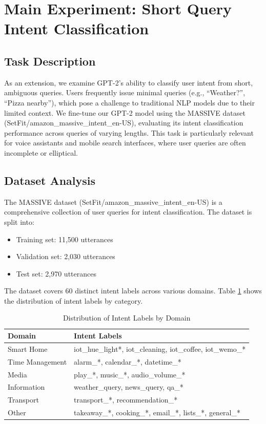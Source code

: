 \documentclass{article}
\begin{document}
\section{Main Experiment: Short Query Intent Classification}
\subsection{Task Description}
As an extension, we examine GPT-2's ability to classify user intent from short, ambiguous queries. Users frequently issue minimal queries (e.g., ``Weather?'', ``Pizza nearby''), which pose a challenge to traditional NLP models due to their limited context. We fine-tune our GPT-2 model using the MASSIVE dataset (SetFit/amazon\_massive\_intent\_en-US), evaluating its intent classification performance across queries of varying lengths. This task is particularly relevant for voice assistants and mobile search interfaces, where user queries are often incomplete or elliptical.

\subsection{Dataset Analysis}
The MASSIVE dataset (SetFit/amazon\_massive\_intent\_en-US) is a comprehensive collection of user queries for intent classification. The dataset is split into:
\begin{itemize}
    \item Training set: 11,500 utterances
    \item Validation set: 2,030 utterances
    \item Test set: 2,970 utterances
\end{itemize}

The dataset covers 60 distinct intent labels across various domains. Table \ref{tab:intent_labels} shows the distribution of intent labels by category.

\begin{table}[h]
\centering
\begin{tabular}{ll}
\toprule
\textbf{Domain} & \textbf{Intent Labels} \\
\midrule
Smart Home & iot\_hue\_light*, iot\_cleaning, iot\_coffee, iot\_wemo\_* \\
\midrule
Time Management & alarm\_*, calendar\_*, datetime\_* \\
\midrule
Media & play\_*, music\_*, audio\_volume\_* \\
\midrule
Information & weather\_query, news\_query, qa\_* \\
\midrule
Transport & transport\_*, recommendation\_* \\
\midrule
Other & takeaway\_*, cooking\_*, email\_*, lists\_*, general\_* \\
\bottomrule
\end{tabular}
\caption{Distribution of Intent Labels by Domain}
\label{tab:intent_labels}
\end{table}
\end{document}
